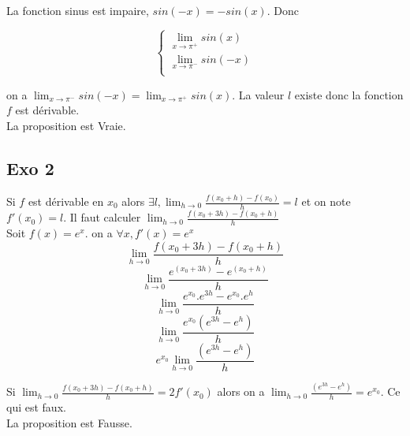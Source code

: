 \documentclass[]{book}
\theoremstyle{definition}
\begin{document}
La fonction sinus est impaire, $sin(-x) = -sin(x)$. Donc

$$ 
\left\{ 
\begin{array}{l}
 \lim_{x \to \pi^{+}} sin(x) \\
 \lim_{x \to \pi^{-}} sin(-x) \\
\end{array}
\right. 
$$

on a $\lim_{x \to \pi^{-}} sin(-x) = \lim_{x \to \pi^{+}} sin(x)$. La valeur $l$ existe donc la fonction $f$ est d\'erivable.\\

La proposition est Vraie.

\subsection*{Exo 2}
Si $f$ est d\'erivable en $x_0$ alors $\exists l, \lim_{h \to 0}\frac{f(x_0+h)-f(x_0)}{h} = l$ et on note $f'(x_0)=l$. Il faut calculer $\lim_{h \to 0}\frac{f(x_0+3h)-f(x_0+h)}{h}$\\

Soit $f(x) = e^{x}$. on a $\forall x, f'(x) = e^{x}$
$$\lim_{h \to 0}\frac{f(x_0+3h)-f(x_0+h)}{h}$$
$$\lim_{h \to 0}\frac{e^{(x_0+3h)} - e^{(x_0+h)}}{h}$$
$$\lim_{h \to 0}\frac{e^{x_0}.e^{3h} - e^{x_0}.e^{h}}{h}$$
$$\lim_{h \to 0}\frac{e^{x_0}(e^{3h}-e^{h})}{h}$$
$$e^{x_0}\lim_{h \to 0}\frac{(e^{3h}-e^{h})}{h}$$

Si $\lim_{h \to 0}\frac{f(x_0+3h)-f(x_0+h)}{h} = 2f'(x_0)$ alors on a $\lim_{h \to 0}\frac{(e^{3h}-e^{h})}{h} = e^{x_0}$. Ce qui est faux.\\

La proposition est Fausse.
\end{document}
